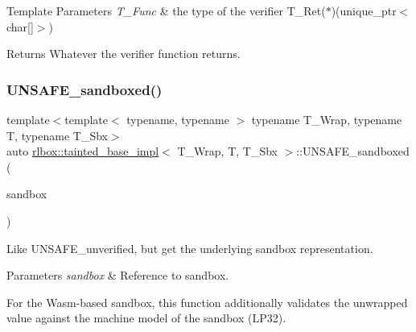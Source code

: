 \begin{DoxyTemplParams}{Template Parameters}
{\em T\+\_\+\+Func} & the type of the verifier {\ttfamily T\+\_\+\+Ret($\ast$)(unique\+\_\+ptr$<$char\mbox{[}\mbox{]}$>$)} \\
\hline
\end{DoxyTemplParams}
\begin{DoxyReturn}{Returns}
Whatever the verifier function returns. 
\end{DoxyReturn}
\mbox{\label{classrlbox_1_1tainted__base__impl_ae2c69129cbb9344e7d2623129f031214}} 
\subsubsection{\texorpdfstring{U\+N\+S\+A\+F\+E\+\_\+sandboxed()}{UNSAFE\_sandboxed()}}
{\footnotesize\ttfamily template$<$template$<$ typename, typename $>$ typename T\+\_\+\+Wrap, typename T, typename T\+\_\+\+Sbx$>$ \\
auto \hyperlink{classrlbox_1_1tainted__base__impl}{rlbox\+::tainted\+\_\+base\+\_\+impl}$<$ T\+\_\+\+Wrap, T, T\+\_\+\+Sbx $>$\+::U\+N\+S\+A\+F\+E\+\_\+sandboxed (\begin{DoxyParamCaption}\item[{\hyperlink{classrlbox_1_1rlbox__sandbox}{rlbox\+\_\+sandbox}$<$ T\+\_\+\+Sbx $>$ \&}]{sandbox }\end{DoxyParamCaption})\hspace{0.3cm}{\ttfamily [inline]}}



Like U\+N\+S\+A\+F\+E\+\_\+unverified, but get the underlying sandbox representation. 


\begin{DoxyParams}{Parameters}
{\em sandbox} & Reference to sandbox.\\
\hline
\end{DoxyParams}
For the Wasm-\/based sandbox, this function additionally validates the unwrapped value against the machine model of the sandbox (L\+P32). \mbox{\label{classrlbox_1_1tainted__base__impl_a1292132a467d30150be6d4e2b72ff6b2}} 
